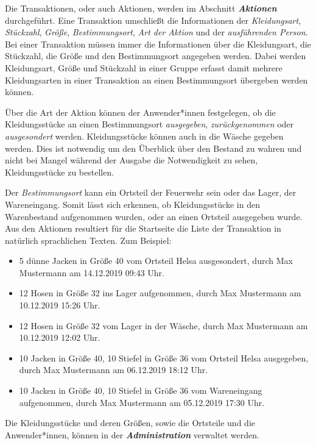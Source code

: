 Die Transaktionen, oder auch Aktionen, werden im Abschnitt \textit{\textbf{Aktionen}} durchgeführt. Eine Transaktion umschließt die Informationen der \textit{Kleidungsart}, \textit{Stückzahl}, \textit{Größe}, \textit{Bestimmungsort}, \textit{Art der Aktion} und der \textit{ausführenden Person}. Bei einer Transaktion müssen immer die Informationen über die Kleidungsart, die Stückzahl, die Größe und den Bestimmungsort angegeben werden. Dabei werden Kleidungsart, Größe und Stückzahl in einer Gruppe erfasst damit mehrere Kleidungsarten in einer Transaktion an einen Bestimmungsort übergeben werden können. 

Über die Art der Aktion können der Anwender*innen festgelegen, ob die Kleidungsstücke an einen Bestimmungsort \textit{ausgegeben}, \textit{zurückgenommen} oder \textit{ausgesondert} werden. Kleidungsstücke können auch in die Wäsche gegeben werden. Dies ist notwendig um den Überblick über den Bestand zu wahren und nicht bei Mangel während der Ausgabe die Notwendigkeit zu sehen, Kleidungsstücke zu bestellen.

Der \textit{Bestimmungsort} kann ein Ortsteil der Feuerwehr sein oder das Lager, \bzw der Wareneingang. Somit lässt sich erkennen, ob Kleidungsstücke in den Warenbestand aufgenommen wurden, oder an einen Ortsteil ausgegeben wurde.
Aus den Aktionen resultiert für die Startseite die Liste der Transaktion in natürlich sprachlichen Texten. Zum Beispiel: 
\begin{itemize}
\item 5 dünne Jacken in Größe 40 vom Ortsteil Helsa ausgesondert, durch Max Mustermann am 14.12.2019 09:43 Uhr.
\item 12 Hosen in Größe 32 ins Lager aufgenommen, durch Max Mustermann am 10.12.2019 15:26 Uhr.
\item 12 Hosen in Größe 32 vom Lager in der Wäsche, durch Max Mustermann am 10.12.2019 12:02 Uhr.
\item 10 Jacken in Größe 40, 10 Stiefel in Größe 36 vom Ortsteil Helsa ausgegeben, durch Max Mustermann am 06.12.2019 18:12 Uhr.
\item 10 Jacken in Größe 40, 10 Stiefel in Größe 36 vom Wareneingang aufgenommen, durch Max Mustermann am 05.12.2019 17:30 Uhr.
\end{itemize}

Die Kleidungsstücke und deren Größen, sowie die Ortsteile und die Anwender*innen, können in der \textbf{\textit{Administration}} verwaltet werden.

